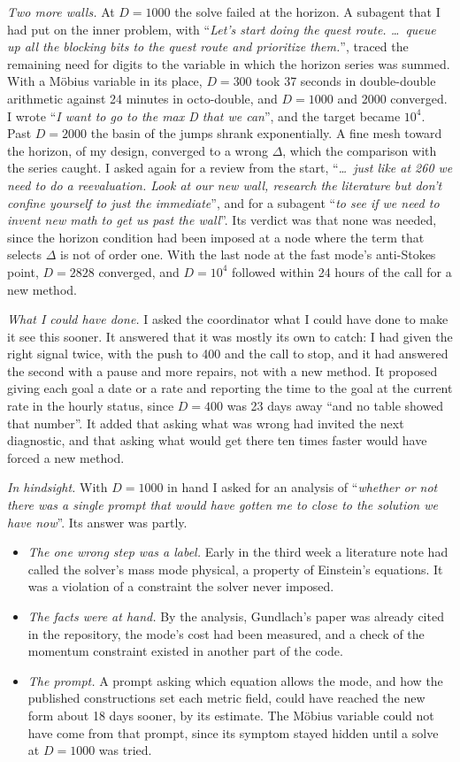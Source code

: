 \documentclass[aps,prd,onecolumn,superscriptaddress,nofootinbib,10pt]{revtex4-2}
\newcommand{\prompt}[1]{``\textit{#1}''}
\begin{document}
\emph{Two more walls.} At $D = 1000$ the solve failed at the horizon. A subagent that I had put on the inner problem,
with \prompt{Let's start doing the quest route. \dots\ queue up all the blocking bits to the quest route and prioritize
them.}, traced the remaining need for digits to the variable in which the horizon series was summed. With a M\"obius
variable in its place, $D = 300$ took 37 seconds in double-double arithmetic against 24 minutes in octo-double, and
$D = 1000$ and 2000 converged. I wrote \prompt{I want to go to the max D that we can}, and the target became $10^4$. Past
$D = 2000$ the basin of the jumps shrank exponentially. A fine mesh toward the horizon, of my design, converged to a
wrong $\Delta$, which the comparison with the series caught. I asked again for a review from the start, \prompt{\dots\
just like at 260 we need to do a reevaluation. Look at our new wall, research the literature but don't confine yourself
to just the immediate}, and for a subagent \prompt{to see if we need to invent new math to get us past the wall}. Its
verdict was that none was needed, since the horizon condition had been imposed at a node where the term that selects
$\Delta$ is not of order one. With the last node at the fast mode's anti-Stokes point, $D = 2828$ converged, and
$D = 10^4$ followed within 24 hours of the call for a new method.

\emph{What I could have done.} I asked the coordinator what I could have done to make it see this sooner. It answered
that it was mostly its own to catch: I had given the right signal twice, with the push to 400 and the call to stop, and
it had answered the second with a pause and more repairs, not with a new method. It proposed giving each goal a date or a
rate and reporting the time to the goal at the current rate in the hourly status, since $D = 400$ was 23 days away ``and
no table showed that number''. It added that asking what was wrong had invited the next diagnostic, and that asking what
would get there ten times faster would have forced a new method.

\emph{In hindsight.} With $D = 1000$ in hand I asked for an analysis of \prompt{whether or not there was a single prompt
that would have gotten me to close to the solution we have now}. Its answer was partly.
\begin{itemize}
\item \emph{The one wrong step was a label.} Early in the third week a literature note had called the solver's mass mode
physical, a property of Einstein's equations. It was a violation of a constraint the solver never imposed.
\item \emph{The facts were at hand.} By the analysis, Gundlach's paper was already cited in the repository, the mode's
cost had been measured, and a check of the momentum constraint existed in another part of the code.
\item \emph{The prompt.} A prompt asking which equation allows the mode, and how the published constructions set each
metric field, could have reached the new form about 18 days sooner, by its estimate. The M\"obius variable could not
have come from that prompt, since its symptom stayed hidden until a solve at $D = 1000$ was tried.
\end{itemize}
\end{document}
